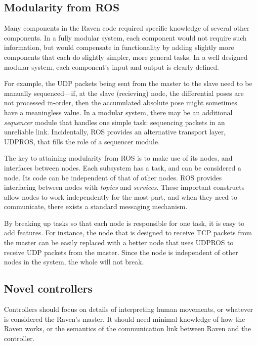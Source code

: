 \documentclass[letterpaper,twocolumn,10pt]{article}
\begin{document}
\subsection{Modularity from ROS}

Many components in the Raven code required specific knowledge of
several other components. In a fully modular system, each component
would not require such information, but would compensate in
functionality by adding slightly more components that each do slightly
simpler, more general tasks. In a well designed modular system, each
component's input and output is clearly defined.

For example, the UDP packets being sent from the master to the slave
need to be manually sequenced---if, at the slave (recieving) node, the
differential poses are not processed in-order, then the accumulated
absolute pose might sometimes have a meaningless value. In a modular
system, there may be an additional \emph{sequencer} module that
handles one simple task: sequencing packets in an unreliable
link. Incidentally, ROS provides an alternative transport layer, 
UDPROS, that fills the role of a sequencer module.

The key to attaining modularity from ROS is to make use of its nodes, 
and interfaces between nodes. Each subsystem has a task, and can be 
considered a node. Its code can be independent of that of other nodes. 
ROS provides interfacing between nodes with \emph{topics} and 
\emph{services}. These important constructs allow nodes to work 
independently for the most part, and when they need to communicate, 
there exists a standard messaging mechanism.

By breaking up tasks so that each node is responsible for one task, 
it is easy to add features. For instance, the node that is designed 
to receive TCP packets from the master can be easily replaced with 
a better node that uses UDPROS to receive UDP packets from the master. 
Since the node is independent of other nodes in the system, the whole 
will not break.


\subsection{Novel controllers}
Controllers should focus on details of interpreting human movements, 
or whatever is considered the Raven's master. It should need minimal 
knowledge of how the Raven works, or the semantics of the 
communication link between Raven and the controller.
\end{document}

